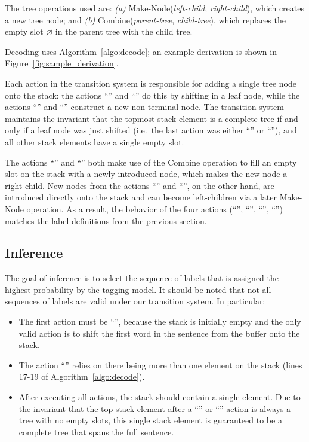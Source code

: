 \documentclass[11pt,a4paper]{article}
\newcommand{\xl}[0]{\rotatebox[origin=c]{45}{$\rightarrow$}}
\newcommand{\xr}[0]{\rotatebox[origin=c]{-45}{$\leftarrow$}}
\newcommand{\xL}[0]{\rotatebox[origin=c]{45}{$\Rightarrow$}}
\newcommand{\xR}[0]{\rotatebox[origin=c]{-45}{$\Leftarrow$}}
\begin{document}
The tree operations used are:
\emph{(a)}
{\sc Make-Node}(\emph{left-child}, \emph{right-child}), which creates a new tree node; and
\emph{(b)}
{\sc Combine}(\emph{parent-tree}, \emph{child-tree}), which replaces the empty slot $\varnothing$ in the parent tree with the child tree.

Decoding uses Algorithm~\ref{algo:decode}; an example derivation is shown in Figure~\ref{fig:sample_derivation}.

Each action in the transition system is responsible for adding a single tree node onto the stack: the actions ``\xl'' and ``\xr'' do this by shifting in a leaf node, while the actions ``\xL'' and ``\xR'' construct a new non-terminal node. The transition system maintains the invariant that the topmost stack element is a complete tree if and only if a leaf node was just shifted (i.e.\ the last action was either ``\xl'' or ``\xr''), and all other stack elements have a single empty slot.

The actions ``\xr'' and ``\xR'' both make use of the {\sc Combine} operation to fill an empty slot on the stack with a newly-introduced node, which makes the new node a right-child. New nodes from the actions ``\xl'' and ``\xL'', on the other hand, are introduced directly onto the stack and can become left-children via a later {\sc Make-Node} operation. As a result, the behavior of the four actions (``\xl'', ``\xr'', ``\xL'', ``\xR'') matches the label definitions from the previous section.

\subsection{Inference}
\label{subsec:inference}

The goal of inference is to select the sequence of labels that is assigned the highest probability by the tagging model. It should be noted that not all sequences of labels are valid under our transition system.
In particular:
\begin{itemize}
\item
The first action must be ``\xl'', because the stack is initially empty and the only valid action is to shift the first word in the sentence from the buffer onto the stack.
\item
The action ``\xR'' relies on there being more than one element on the stack (lines {17-19} of Algorithm~\ref{algo:decode}).
\item
After executing all actions, the stack should contain a single element. Due to the invariant that the top stack element after a ``\xl'' or ``\xr'' action is always a tree with no empty slots, this single stack element is guaranteed to be a complete tree that spans the full sentence.
\end{itemize}
\end{document}
